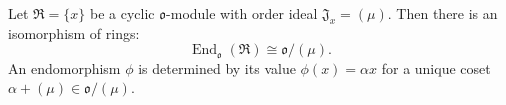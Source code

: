 Let $\mathfrak{R} = \{x\}$ be a cyclic $\mathfrak{o}$-module with order ideal $\mathfrak{J}_x = (\mu)$. Then there is an isomorphism of rings:
$$\operatorname{End}_{\mathfrak{o}}(\mathfrak{R}) \cong \mathfrak{o} / (\mu).$$
An endomorphism $\phi$ is determined by its value $\phi(x) = \alpha x$ for a unique coset $\alpha + (\mu) \in \mathfrak{o} / (\mu)$.
